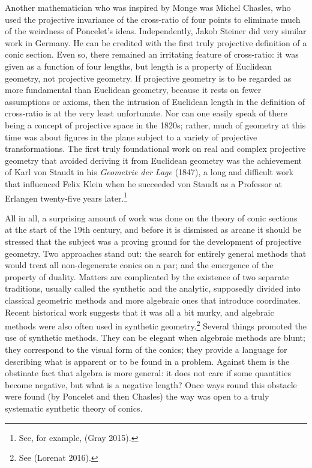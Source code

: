 Another mathematician who was inspired by Monge was Michel Chasles, who used the projective invariance of the cross-ratio of four points to eliminate much of the weirdness of Poncelet's ideas. Independently, Jakob Steiner did very similar work in Germany. He can be credited with the first truly projective definition of a conic section. Even so, there remained an irritating feature of cross-ratio: it was given as a function of four lengths, but length is a property of Euclidean geometry, not projective geometry.  If projective geometry is to be regarded as more fundamental than Euclidean geometry, because it rests on fewer assumptions or axioms, then the intrusion of Euclidean length in the definition of cross-ratio is at the very least unfortunate. Nor can one easily speak of there being a concept of projective space in the 1820s; rather, much of geometry at this time was about figures in the plane subject to a variety of projective transformations. The first truly foundational work on real and complex projective geometry that avoided deriving it from Euclidean geometry was the achievement of Karl von Staudt in his \emph{Geometrie der Lage} (1847), a long and difficult work that influenced Felix Klein when he succeeded von Staudt as a Professor at Erlangen twenty-five years later.\footnote{See, for example, (Gray 2015).}

All in all, a surprising amount of work was done on the theory of conic sections  at the start of the 19th century, and before it is dismissed as arcane it should be stressed that the subject was a proving ground for the development of projective geometry. Two approaches stand out: the search for entirely  general methods that would treat all non-degenerate conics on a par; and the emergence of the property of duality. Matters are complicated by the existence of two separate traditions, usually called the synthetic and the analytic, supposedly divided into classical geometric methods and more algebraic ones that introduce coordinates. 
Recent historical work suggests that it was all a bit murky, and algebraic methods were also often used in synthetic geometry.\footnote{See (Lorenat 2016).} Several things promoted the use of synthetic methods. They can be elegant when algebraic methods are blunt; they correspond to the visual form of the conics; they provide a language for describing what is apparent or to be found in a problem. Against them is the obstinate fact that algebra is more general: it does not care if some quantities become negative, but what is a negative length? Once ways round this obstacle were found (by Poncelet and then Chasles) the way was open to a truly systematic synthetic theory of conics.   

